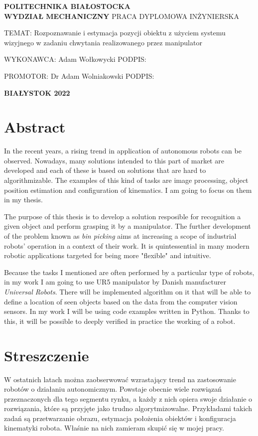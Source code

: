 \documentclass{article}
\newcommand\filling[1][4cm]{\makebox[#1]{\dotfill}}
\begin{document}
\begin{center}
\huge{\textbf{POLITECHNIKA BIAŁOSTOCKA}} \\
\LARGE{\textbf{WYDZIAŁ MECHANICZNY}} 
\vfill
\huge{PRACA DYPLOMOWA INŻYNIERSKA}
\vfill
\end{center}

\LARGE{TEMAT: Rozpoznawanie i estymacja pozycji obiektu z użyciem systemu wizyjnego w zadaniu chwytania realizowanego przez manipulator}
\vfill
\begin{flushright}
\LARGE{WYKONAWCA: Adam Wołkowycki}
\vfill
\LARGE{PODPIS: \filling[4cm]}
\vfill
\end{flushright}
\LARGE{PROMOTOR: Dr Adam Wolniakowski}
\vfill
\LARGE{PODPIS: \filling[4cm]}
\vfill
\Large{}

\begin{center}
\Large{\textbf{BIAŁYSTOK 2022}}
\end{center}
\thispagestyle{empty}

\newpage
\section*{\LARGE{Abstract}}
In the recent years, a rising trend in application of autonomous robots can be observed. Nowadays, many solutions intended to this part of market are developed and each of these is based on solutions that are hard to algorithmizable. The examples of this kind of tasks are image processing, object position estimation and configuration of kinematics. I am going to focus on them in my thesis.

The purpose of this thesis is to develop a solution resposible for recognition a given object and perform grasping it by a manipulator. The further development of the problem known as \emph{bin picking} aims at increasing a scope of industrial robots' operation in a context of their work. It is quintessential in many modern robotic applications targeted for being more "flexible" and intuitive.

Because the tasks I mentioned are often performed by a particular type of robots, in my work I am going to use UR5 manipulator by Danish manufacturer \emph{Universal Robots}. There will be implemented algorithm on it that will be able to define a location of seen objects based on the data from the computer vision sensors. In my work I will be using code examples written in Python. Thanks to this, it will be possible to deeply verified in practice the working of a robot.

\newpage
\section*{\LARGE{Streszczenie}}
W ostatnich latach można zaobserwować wzrastający trend na zastosowanie robotów o działaniu autonomicznym. Powstaje obecnie wiele rozwiązań przeznaczonych dla tego segmentu rynku, a każdy z nich opiera swoje działanie o rozwiązania, które są przyjęte jako trudno algorytmizowalne. Przykładami takich zadań są przetwarzanie obrazu, estymacja położenia obiektów i konfiguracja kinematyki robota. Właśnie na nich zamieram skupić się w mojej pracy.
\end{document}
